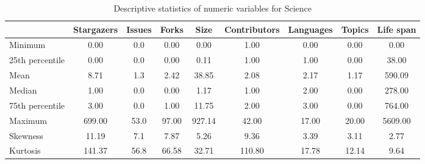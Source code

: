\begin{table}
\centering
\caption{Descriptive statistics of numeric variables for Science}
\label{tab:Science}
\begin{tabular}{lcccccccc}
\toprule
{} &  Stargazers &  Issues &  Forks &    Size &  Contributors &  Languages &  Topics &  Life span \\
\midrule
Minimum         &        0.00 &     0.0 &   0.00 &    0.00 &          1.00 &       0.00 &    0.00 &       0.00 \\
25th percentile &        0.00 &     0.0 &   0.00 &    0.11 &          1.00 &       1.00 &    0.00 &      38.00 \\
Mean            &        8.71 &     1.3 &   2.42 &   38.85 &          2.08 &       2.17 &    1.17 &     590.09 \\
Median          &        1.00 &     0.0 &   0.00 &    1.17 &          1.00 &       2.00 &    0.00 &     278.00 \\
75th percentile &        3.00 &     0.0 &   1.00 &   11.75 &          2.00 &       3.00 &    0.00 &     764.00 \\
Maximum         &      699.00 &    53.0 &  97.00 &  927.14 &         42.00 &      17.00 &   20.00 &    5609.00 \\
Skewness        &       11.19 &     7.1 &   7.87 &    5.26 &          9.36 &       3.39 &    3.11 &       2.77 \\
Kurtosis        &      141.37 &    56.8 &  66.58 &   32.71 &        110.80 &      17.78 &   12.14 &       9.64 \\
\bottomrule
\end{tabular}
\end{table}
